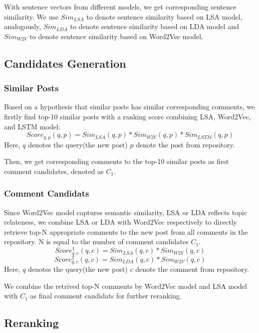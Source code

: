 \documentclass{llncs}
\begin{document}
With sentence vectors from different models, we get corresponding sentence similarity. We use $Sim_{LSA}$ to denote sentence similarity based on LSA model, analogously, $Sim_{LDA}$ to denote sentence similarity based on LDA model and $Sim_{W2V}$ to denote sentence similarity based on Word2Vec model.

\subsection{Candidates Generation}

\subsubsection{Similar Posts}
Based on a hypothesis that similar posts has similar corresponding comments, we firstly find top-10 similar posts with a ranking score combining LSA, Word2Vec, and LSTM model:
\begin{equation}
   Score_{q,p}(q, p) = Sim_{LSA}(q, p) * Sim_{W2V}(q, p) * Sim_{LSTM}(q, p)
\end{equation}
Here, $q$ denotes the query(the new post) $p$ denote the post from repository.

Then, we get corresponding comments to the top-10 similar posts as first comment candidates, denoted as $C_1$.

\subsubsection{Comment Candidats}
Since Word2Vec model captures semantic similarity, LSA or LDA reflects topic relateness, we combine LSA or LDA with Word2Vec respectively to directly retrieve top-N appropriate comments to the new post from all comments in the repository. N is equal to the number of comment candidates $C_1$. 
\begin{equation}
   Score_{q,c}^1(q, c) = Sim_{LSA}(q, c) * Sim_{W2V}(q, c)
\end{equation}
\begin{equation}
   Score_{q,c}^2(q, c) = Sim_{LDA}(q, c) * Sim_{W2V}(q, c)
\end{equation}
Here, $q$ denotes the query(the new post) $c$ denote the comment from repository.

We combine the retrived top-N comments by Word2Vec model and LSA model with $C_1$ as final comment candidats for further reranking.

\subsection{Reranking}
\end{document}
